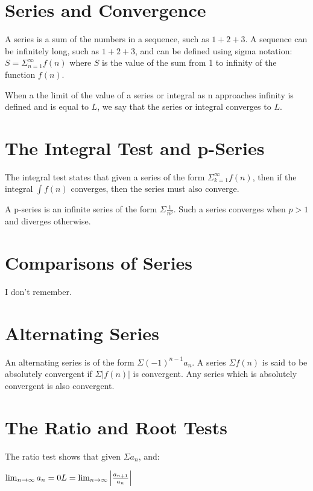 \documentclass{article}
\begin{document}
\section{Series and Convergence}

A series is a sum of the numbers in a sequence, such as $1+2+3$.  A
sequence can be infinitely long, such as $1+2+3$, and can be defined
using sigma notation: $S = \Sigma^\infty_{n=1}f(n)$ where $S$ is the
value of the sum from 1 to infinity of the function $f(n)$.

When a the limit of the value of a series or integral as n approaches
infinity is defined and is equal to $L$, we say that the series or
integral converges to $L$.

\section{The Integral Test and p-Series}

The integral test states that given a series of the form
$\Sigma^\infty_{k=1}f(n)$, then if the integral $\int f(n)$ converges,
then the series must also converge.

A p-series is an infinite series of the form $\Sigma \frac{1}{n^p}$.
Such a series converges when $p > 1$ and diverges otherwise.

\section{Comparisons of Series}

I don't remember.

\section{Alternating Series}

An alternating series is of the form $\Sigma (-1)^{n-1}a_n$.  A series
$\Sigma f(n)$ is said to be absolutely convergent if $\Sigma \left|
  f(n) \right|$ is convergent.  Any series which is absolutely
convergent is also convergent.

\section{The Ratio and Root Tests}

The ratio test shows that given $\Sigma a_n$, and:

\begin{math}
  \lim_{n \to \infty} a_n = 0 \\
  L = \lim_{n \to \infty} \left| \frac{a_{n+1}}{a_n} \right|
\end{math}
\end{document}
